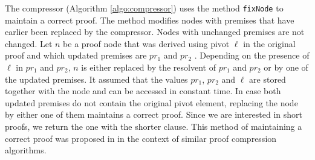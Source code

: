 

The compressor (Algorithm \ref{algo:compressor}) uses the method \texttt{fixNode} to maintain a correct proof.
The method modifies nodes with premises that have earlier been replaced by the compressor. 
Nodes with unchanged premises are not changed.
Let $n$ be a proof node that was derived using pivot $\ell$ in the original proof and which updated premises are $pr_1$ and $pr_2$ .
Depending on the presence of $\ell$ in $pr_1$ and $pr_2$, $n$ is either replaced by the resolvent of $pr_1$ and $pr_2$ or by one of the updated premises.
It assumed that the values $pr_1$, $pr_2$ and $\ell$ are stored together with the node and can be accessed in constant time.
In case both updated premises do not contain the original pivot element, replacing the node by either one of them maintains a correct proof.
Since we are interested in short proofs, we return the one with the shorter clause.
This method of maintaining a correct proof was proposed in \cite{Bar-Ilan2008} in the context of similar proof compression algorithms.



\FloatBarrier
